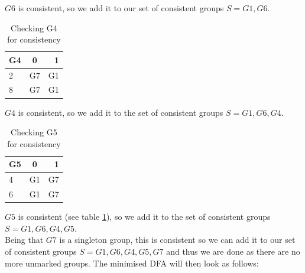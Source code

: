 \documentclass{article}
\begin{document}
\(G6\) is consistent, so we add it to our set of consistent groups \(S={G1, G6}\).\\
\begin{table}[h]
	\begin{center}
		\begin{tabular}{|l|c|r|}
			\hline
			G4 & 0 & 1\\\hline
			2 & G7 & G1\\\hline
			8 & G7 & G1\\\hline
		\end{tabular}
	\caption{Checking G4 for consistency}
	\end{center}
\end{table}
\(G4\) is consistent, so we add it to the set of consistent groups \(S={G1, G6, G4}\).\\
\begin{table}[h]
	\begin{center}
		\begin{tabular}{|l|c|r|}
			\hline
			G5 & 0 & 1\\\hline
			4 & G1 & G7\\\hline
			6 & G1 & G7\\\hline
		\end{tabular}
	\end{center}
	\caption{Checking G5 for consistency}
	\label{g5-check}
\end{table}
\(G5\) is consistent (see table \ref{g5-check}), so we add it to the set of consistent groups \(S={G1, G6, G4, G5}\).\\
Being that \(G7\) is a singleton group, this is consistent so we can add it to our set of consistent groups \(S={G1, G6, G4, G5, G7}\) and thus we are done as there are no more unmarked groups.\newpage
The minimised DFA will then look as follows: 
\end{document}
